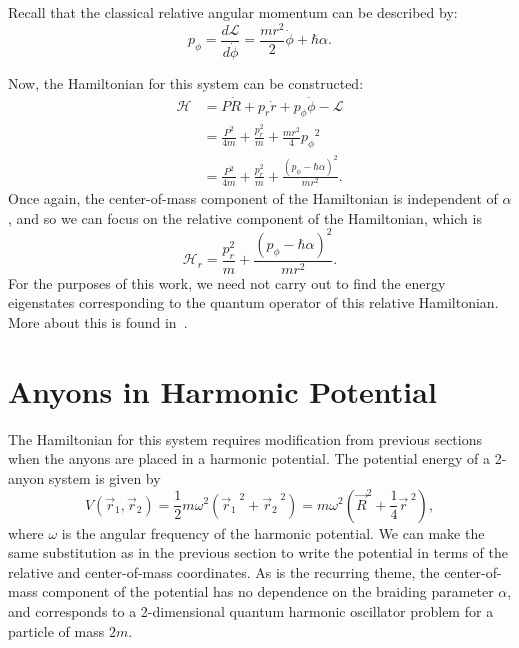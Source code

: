 Recall that the classical relative angular momentum can be described by:
\begin{equation}
    p_\phi = \frac{d\mathcal{L}}{d\dot{\phi}} = \frac{mr^2}{2}\dot{\phi} + \hbar\alpha.
\end{equation}

Now, the Hamiltonian for this system can be constructed:
\begin{align}
    \mathcal{H} 
    &= P\dot{R} + p_r\dot{r} + p_\phi\dot{\phi} - \mathcal{L} \nonumber \\
    &= \frac{P^2}{4m} + \frac{p_r^{2}}{m} + \frac{mr^2}{4} {p_\phi}^2 \nonumber \\
    &= \frac{P^2}{4m} + \frac{p_r^{2}}{m} + \frac{{\left( p_\phi - \hbar\alpha \right)}^2}{mr^2}.
\end{align}
Once again, the center-of-mass component of the Hamiltonian is independent of $\alpha$, and so we can focus on the relative component of the Hamiltonian, which is
\begin{equation}
    \mathcal{H}_r = \frac{p_r^{2}}{m} + \frac{{\left( p_\phi - \hbar\alpha \right)}^2}{mr^2}.\label{eq:basic_Hr}
\end{equation}
For the purposes of this work, we need not carry out to find the energy eigenstates corresponding to the quantum operator of this relative Hamiltonian. More about this is found in~\cite{Khare2005}.


\section{Anyons in Harmonic Potential}\label{sec:mult_harmonic}

The Hamiltonian for this system requires modification from previous sections when the anyons are placed in a harmonic potential. The potential energy of a 2-anyon system is given by
\begin{equation}
    V(\vec{r}_1,\vec{r}_2) = \frac{1}{2}m\omega^2\left( {\vec{r}_1}^{\;2} + {\vec{r}_2}^{\;2} \right) = m\omega^2\left( {\vec{R}}^2 + \frac{1}{4}{\vec{r}}^{\;2} \right),
\end{equation}
where $\omega$ is the angular frequency of the harmonic potential. We can make the same substitution as in the previous section to write the potential in terms of the relative and center-of-mass coordinates. As is the recurring theme, the center-of-mass component of the potential has no dependence on the braiding parameter $\alpha$, and corresponds to a 2-dimensional quantum harmonic oscillator problem for a particle of mass $2m$.

